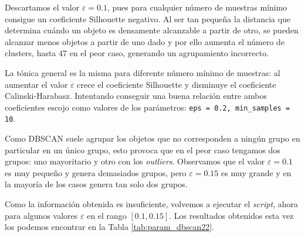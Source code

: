 \documentclass[a4paper, 20pt]{article}
\begin{document}
Descartamos el valor $\varepsilon = 0.1$, pues para cualquier número de muestras mínimo consigue un coeficiente Silhouette negativo. Al ser tan pequeña la distancia que determina cuándo un objeto es densamente alcanzable a partir de otro, se pueden alcanzar menos objetos a partir de uno dado y por ello aumenta el número de clusters, hasta 47 en el peor caso, generando un agrupamiento incorrecto.

La tónica general es la misma para diferente número mínimo de muestras: al aumentar el valor $\varepsilon$ crece el coeficiente Silhouette y disminuye el coeficiente Calinski-Harabasz. Intentando conseguir una buena relación entre ambos coeficientes escojo como valores de los parámetros: \texttt{eps = 0.2, min\_samples = 10}.

Como DBSCAN suele agrupar los objetos que no corresponden a ningún grupo en particular en un único grupo, esto provoca que en el peor caso tengamos dos grupos: uno mayoritario y otro con los \textit{outliers}. Observamos que el valor $\varepsilon = 0.1$ es muy pequeño y genera demasiados grupos, pero $\varepsilon = 0.15$ es muy grande y en la mayoría de los casos genera tan solo dos grupos.

Como la información obtenida es insuficiente, volvemos a ejecutar el \textit{script}, ahora para algunos valores $\varepsilon$ en el rango $[0.1, 0.15]$. Los resultados obtenidos esta vez los podemos encontrar en la Tabla \ref{tab:param_dbscan22}.
\end{document}
